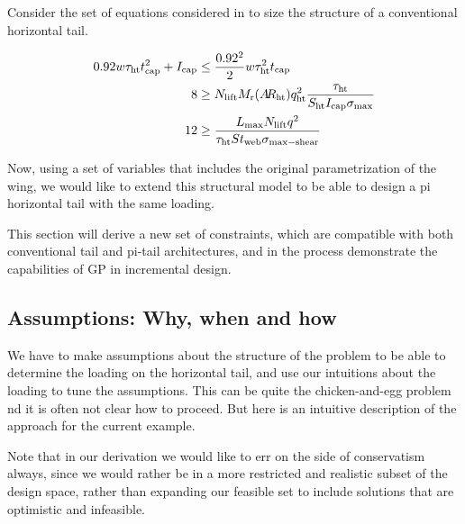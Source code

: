 Consider the set of equations considered in \cite{SP_ac_design} to size
the structure of a conventional horizontal tail. 

\begin{align}
    0.92 w\tau_{\rm{ht}} t_{\rm{cap}}^2 + I_{\rm{cap}} &\leq \frac{0.92^2}{2}w\tau_{\rm{ht}}^2t_{\rm{cap}}\\
    8 &\geq N_{\rm{lift}}M_{\rm{r}}(A\hspace{-2.0pt}R_{\rm{ht}})q_{\rm{ht}}^2\frac{\tau_{\rm{ht}}}{S_{\rm{ht}} I_{\rm{cap}}\sigma_{\rm{max}}}\\
    12 &\geq \frac{L_{\rm{max}} N_{\rm{lift}} q^2}{\tau_{\rm{ht}} S t_{\rm{web}} \sigma_{\rm{max-shear}}}
\end{align}

Now, using a set of variables that includes the original parametrization of the wing, 
we would like to extend this structural model to be able to design a pi horizontal tail
with the same loading. 

This section will derive a new set of constraints, which are compatible with 
both conventional tail and pi-tail architectures, and in the process demonstrate the 
capabilities of \gls{GP} in incremental design. 



\subsection{Assumptions: Why, when and how}

We have to make assumptions about the structure of the problem to be able
to determine the loading on the horizontal tail, and use our intuitions about the 
loading to tune the assumptions. This can be quite the chicken-and-egg problem
nd it is often not clear how to proceed. But here is an 
intuitive description of the approach for the current example. 

Note that in our derivation we would like to err on the side of conservatism always, since we would
rather be in a more restricted and realistic subset of the design space, rather than 
expanding our feasible set to include solutions that are optimistic and infeasible. 

